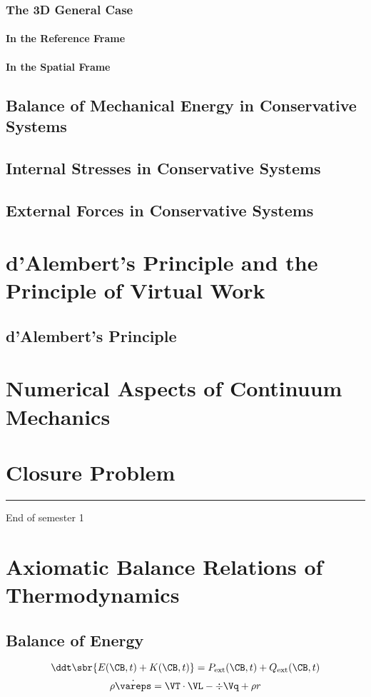 \documentclass[a5paper,twosided,11pt,DIV=15,BCOR=0mm]{scrbook}
\newcommand{\veps}{\vareps}
\newcommand{\ext}{\ensuremath{\textup{ext}}}
\begin{document}
\subsection{The 3D  General Case}

\subsubsection{In the Reference Frame}
\subsubsection{In the Spatial Frame}
\section{Balance of Mechanical Energy in Conservative Systems}
\section{Internal Stresses in Conservative Systems}
\section{External Forces in Conservative Systems}

\chapter{d'Alembert's Principle and the Principle of Virtual Work}
\section{d'Alembert's Principle}

\chapter{Numerical Aspects of Continuum Mechanics}


\chapter{Closure Problem}
%
%
\rule{0.3\linewidth}{0.25pt}
End of semester 1
%
\chapter{Axiomatic Balance Relations of Thermodynamics}
\section{Balance of Energy}
%
\begin{equation}
  \ddt \sbr{E(\CB,t)+K(\CB,t)} = P_{\ext}(\CB,t)+Q_{\ext}(\CB,t)
\end{equation}
\begin{equation}
 \rho\dot{\veps} = \VT\cdot\VL - \div \Vq + \rho r
\end{equation}
%
\end{document}
